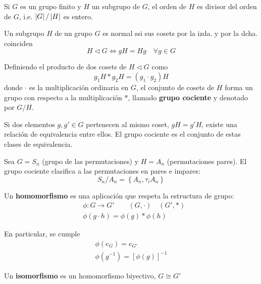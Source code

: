 \begin{teorema}[Lagrange] 
Si $G$ es un grupo finito y $H$ un subgrupo de $G$, el orden de $H$ es divisor del orden de $G$, i.e. $\left\lvert G\right\rvert/\left\lvert H\right\rvert$ es entero.
\end{teorema}

\begin{teorema}
Un subgrupo $H$ de un grupo $G$ es normal ssi sus cosets por la izda. y por la dcha. coinciden
\begin{equation}
H\triangleleft G \Longleftrightarrow gH=Hg \quad \forall g\in G
\end{equation}
\end{teorema}

\begin{definicion}
Definiendo el producto de dos cosets de $H\triangleleft G$ como
\begin{equation}
g_1 H \ast g_2 H=(g_1\cdot g_2) H
\end{equation}
donde $\cdot$ es la multiplicación ordinaria en $G$, el conjunto de cosets de $H$ forma un grupo con respecto a la multiplicación $\ast$, llamado \textbf{grupo cociente} y denotado por $G/H$. 
\end{definicion}

Si dos elementos $g,g'\in G$ pertenecen al mismo coset, $gH=g'H$, existe una relación de equivalencia entre ellos. El grupo cociente es el conjunto de estas clases de equivalencia. 
\begin{ejemplo}
Sea $G=S_n$ (grupo de las permutaciones) y $H=A_n$ (permutaciones pares). El grupo cociente clasifica a las permutaciones en pares e impares:
\begin{equation}
S_n/A_n=\left\{A_n,\tau_i A_n \right \}
\end{equation} \label{ejemplo_permutaciones_pares}
\end{ejemplo}


\begin{definicion}
Un \textbf{homomorfismo} es una aplicación que respeta la estructura de grupo:
\begin{subequations}
\begin{flalign}
&\phi: G\rightarrow G'\qquad (G,\cdot)\quad (G',\ast)\\
&\phi(g\cdot h)=\phi(g)\ast \phi(h)
\end{flalign}
\end{subequations}

En particular, se cumple
\begin{subequations}
\begin{gather}
\phi(e_G)=e_{G'}\\
\phi(g^{-1})=\left[\phi(g)\right]^{-1}
\end{gather}
\end{subequations}


Un \textbf{isomorfismo} es un homomorfismo biyectivo, $G\cong G'$
\end{definicion}

